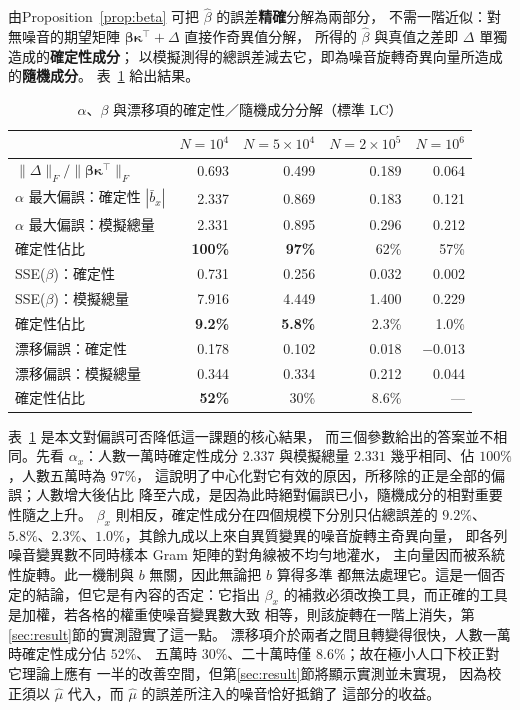 \documentclass[UTF8, fontset=macnew, a4paper, 12pt]{ctexart}
\begin{document}
由Proposition~\ref{prop:beta} 可把 $\hat\beta$ 的誤差\textbf{精確}分解為兩部分，
不需一階近似：對無噪音的期望矩陣
$\boldsymbol\beta\boldsymbol\kappa^{\top}+\Delta$ 直接作奇異值分解，
所得的 $\hat\beta$ 與真值之差即 $\Delta$ 單獨造成的\textbf{確定性成分}；
以模擬測得的總誤差減去它，即為噪音旋轉奇異向量所造成的\textbf{隨機成分}。
表~\ref{tab:betadec} 給出結果。

\begin{table}[H]
\centering
\caption{$\alpha$、$\beta$ 與漂移項的確定性／隨機成分分解（標準 LC）}
\small
\begin{tabular}{lrrrr}
\toprule
 & $N=10^4$ & $N=5\times10^4$ & $N=2\times10^5$ & $N=10^6$\\
\midrule
$\|\Delta\|_F/\|\boldsymbol\beta\boldsymbol\kappa^{\top}\|_F$
 & 0.693 & 0.499 & 0.189 & 0.064\\
\midrule
$\alpha$ 最大偏誤：確定性 $|\bar b_x|$ & 2.337 & 0.869 & 0.183 & 0.121\\
$\alpha$ 最大偏誤：模擬總量 & 2.331 & 0.895 & 0.296 & 0.212\\
\quad 確定性佔比 & \textbf{100\%} & \textbf{97\%} & 62\% & 57\%\\
\midrule
SSE($\beta$)：確定性 & 0.731 & 0.256 & 0.032 & 0.002\\
SSE($\beta$)：模擬總量 & 7.916 & 4.449 & 1.400 & 0.229\\
\quad 確定性佔比 & \textbf{9.2\%} & \textbf{5.8\%} & 2.3\% & 1.0\%\\
\midrule
漂移偏誤：確定性 & 0.178 & 0.102 & 0.018 & $-0.013$\\
漂移偏誤：模擬總量 & 0.344 & 0.334 & 0.212 & 0.044\\
\quad 確定性佔比 & \textbf{52\%} & 30\% & 8.6\% & ---\\
\bottomrule
\end{tabular}
\label{tab:betadec}
\end{table}

表~\ref{tab:betadec} 是本文對偏誤可否降低這一課題的核心結果，
而三個參數給出的答案並不相同。先看 $\alpha_x$：人數一萬時確定性成分
$2.337$ 與模擬總量 $2.331$ 幾乎相同、佔 $100\%$，人數五萬時為 $97\%$，
這說明了中心化對它有效的原因，所移除的正是全部的偏誤；人數增大後佔比
降至六成，是因為此時絕對偏誤已小，隨機成分的相對重要性隨之上升。
$\beta_x$ 則相反，確定性成分在四個規模下分別只佔總誤差的 $9.2\%$、
$5.8\%$、$2.3\%$、$1.0\%$，其餘九成以上來自異質變異的噪音旋轉主奇異向量，
即各列噪音變異數不同時樣本 Gram 矩陣的對角線被不均勻地灌水，
主向量因而被系統性旋轉。此一機制與 $b$ 無關，因此無論把 $b$ 算得多準
都無法處理它。這是一個否定的結論，但它是有內容的否定：它指出 $\beta_x$
的補救必須改換工具，而正確的工具是加權，若各格的權重使噪音變異數大致
相等，則該旋轉在一階上消失，第\ref{sec:result}節的實測證實了這一點。
漂移項介於兩者之間且轉變得很快，人數一萬時確定性成分佔 $52\%$、
五萬時 $30\%$、二十萬時僅 $8.6\%$；故在極小人口下校正對它理論上應有
一半的改善空間，但第\ref{sec:result}節將顯示實測並未實現，
因為校正須以 $\hat\mu$ 代入，而 $\hat\mu$ 的誤差所注入的噪音恰好抵銷了
這部分的收益。
\end{document}
